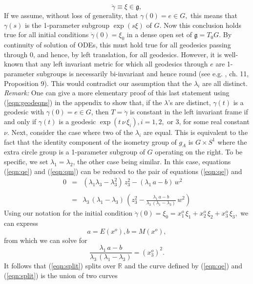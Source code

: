 \documentclass[12pt,reqno]{amsart}\usepackage{amssymb,amsmath,amscd,epsfig,amsthm,enumerate,import,eufrak}
\theoremstyle{definition}
\theoremstyle{remark}
\numberwithin{equation}{section}
\theoremstyle{plain}
\theoremstyle{definition}
\def \r {\mathbb{R}}
\def \mfg {\mathfrak{g}}
\def \vs {\vskip 2mm}
\theoremstyle{remark}
\numberwithin{theorem}{section}
\begin{document}
%
\[
	\dot{\gamma} \equiv \xi \in \mfg,
\]
%
If we assume, without loss of generality, that $\gamma(0) = e \in G,$ this means that $\gamma(s)$ is the 1-parameter subgroup $\exp(s \xi)$ of $G$. Now this conclusion holds true for all initial conditions $\dot{\gamma}(0) = \xi_0$ in a dense open set of $\mfg = T_0G.$ By continuity of solution of ODEs, this must hold true for all geodesics passing through 0, and hence, by left translation, for all geodesics. However, it is well-known that any left invariant metric for which all geodesics through $e$ are 1-parameter subgroups is necessarily bi-invariant and hence round (see e.g. \cite{o}, ch. 11, Proposition 9). This would contradict our assumption that the $\lambda_i$ are all distinct. 
%
\vs
%
{\em Remark:} One can give a more elementary proof of this last statement using (\ref{eqn:geodeqns}) in the appendix \cite{web} to show that, if the $\lambda$'s are distinct, $\gamma(t)$ is a geodesic with $\gamma(0) = e \in G$, then $T = \dot{\gamma}$ is constant in the left invariant frame if and only if $\gamma(t)$ is a geodesic $\exp(t \, \nu \, \xi_i), i = 1, 2,$ or $3$, for some real constant $\nu$.
%
\vs
%
Next, consider the case where two of the $\lambda_i$ are equal. This is equivalent to the fact that the identity component of the isometry group of $g_A$ is $G\times S^1$ where the extra circle group is a 1-parameter subgroup of $G$ operating on the right. To be specific, we set $\lambda_1 = \lambda_2$, the other case being similar. In this case, equations (\ref{eqn:qe}) and (\ref{eqn:qm}) can be reduced to the pair of equations (\ref{eqn:qe}) and
%
\begin{equation} \label{eqn:split}
	\begin{array}{rcl} 0 & = & (\lambda_1 \lambda_3 - \lambda_3^2) \, z_3^2 - (\lambda_1 \, a - b) \, w^2 \\
					& & \\
					& = & \lambda_3 \, (\lambda_1 - \lambda_3) \, ( z_3^2 - \frac{\lambda_1 \, a - b}{\lambda_3 \, (\lambda_1 - \lambda_3)} \, w^2)
	\end{array}
\end{equation}
%
Using our notation for the initial condition $\dot{\gamma}(0) = \xi_0 = x_1^o \, \xi_1 + x_2^o \, \xi_2 + x_3^o \, \xi_3,$ we can express
%
\[
	a = E(x^o), b = M(x^o),
\]
%
from which we can solve for 
%
\[
	\frac{\lambda_1 \, a - b}{\lambda_3 \, (\lambda_1 - \lambda_3)} = (x_3^o)^2.
\]	
%
It follows that (\ref{eqn:split}) splits over $\r$ and the curve defined by (\ref{eqn:qe}) and (\ref{eqn:split}) is the union of two curves
\end{document}
